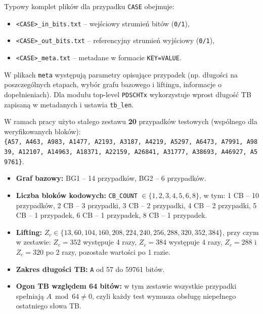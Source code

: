Typowy komplet plików dla przypadku \texttt{CASE} obejmuje:
\begin{itemize}
    \item \texttt{<CASE>\_in\_bits.txt} -- wejściowy strumień bitów (\texttt{0/1}),
    \item \texttt{<CASE>\_out\_bits.txt} -- referencyjny strumień wyjściowy (\texttt{0/1}),
    \item \texttt{<CASE>\_meta.txt} -- metadane w formacie \texttt{KEY=VALUE}.
\end{itemize}

W plikach \texttt{meta} występują parametry opisujące przypadek (np. długości na poszczególnych etapach,
wybór grafu bazowego i liftingu, informacje o dopełnieniach). Dla modułu top-level \texttt{PDSCHTx}
 wykorzystuje wprost długość TB zapisaną w metadanych i ustawia \texttt{tb\_len}.

W ramach pracy użyto stałego zestawu \textbf{20} przypadków testowych (wspólnego dla weryfikowanych bloków):
\texttt{\{A57,\allowbreak\ A463,\allowbreak\ A983,\allowbreak\ A1477,\allowbreak\ A2193,\allowbreak\ A3187,\allowbreak\ A4219,\allowbreak\ A5297,\allowbreak\ A6473,\allowbreak\ A7991,\allowbreak\ A9839,\allowbreak\ A12107,\allowbreak\ A14963,\allowbreak\ A18371,\allowbreak\ A22159,\allowbreak\ A26841,\allowbreak\ A31777,\allowbreak\ A38693,\allowbreak\ A46927,\allowbreak\ A59761\}}.

\begin{itemize}
    \item \textbf{Graf bazowy:} BG1 -- 14 przypadków, BG2 -- 6 przypadków.
    \item \textbf{Liczba bloków kodowych:} \texttt{CB\_COUNT} $\in \{1,2,3,4,5,6,8\}$, w tym:
          1 CB -- 10 przypadków, 2 CB -- 3 przypadki, 3 CB -- 2 przypadki, 4 CB -- 2 przypadki,
          5 CB -- 1 przypadek, 6 CB -- 1 przypadek, 8 CB -- 1 przypadek.
    \item \textbf{Lifting:} $Z_c \in \{13,60,104,160,208,224,240,256,288,320,352,384\}$, przy czym w zestawie:
          $Z_c=352$ występuje 4 razy, $Z_c=384$ występuje 4 razy, $Z_c=288$ i $Z_c=320$ po 2 razy,
          pozostałe wartości po 1 razie.
    \item \textbf{Zakres długości TB:} \texttt{A} od 57 do 59761 bitów.
    \item \textbf{Ogon TB względem 64 bitów:} w tym zestawie wszystkie przypadki spełniają $A \bmod 64 \neq 0$,
          czyli każdy test wymusza obsługę niepełnego ostatniego słowa TB.
\end{itemize}

